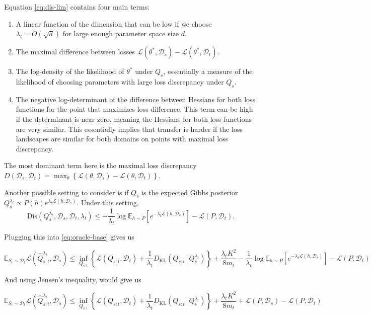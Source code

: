 \documentclass[letterpaper]{article}
\theoremstyle{definition}
\begin{document}
Equation \eqref{eq:dis-lim} contains four main terms:
\begin{enumerate}
	\item A linear function of the dimension that can be low if we choose $\lambda_t=O(\sqrt{d})$ for large enough parameter space size $d$.
	\item The maximal difference between losses $\mathcal{L}(\theta^*, \mathcal{D}_s)-\mathcal{L}(\theta^*, \mathcal{D}_t)$.
	\item The log-density of the likelihood of $\theta^*$ under $Q_s$, essentially a measure of the likelihood of choosing parameters with large loss discrepancy under $Q_s$.
	\item The negative log-determinant of the difference between Hessians for both loss functions for the point that maximizes loss difference. This term can be high if the determinant is near zero, meaning the Hessians for both loss functions are very similar. This essentially implies that transfer is harder if the loss landscapes are similar for both domains on points with maximal loss discrepancy.
\end{enumerate}

The most dominant term here is the maximal loss discrepancy $D(\mathcal{D}_s, \mathcal{D}_t)=\max_{\theta}\left \{\mathcal{L}(\theta, \mathcal{D}_s)-\mathcal{L}(\theta, \mathcal{D}_t) \right \}$.


Another possible setting to consider is if $Q_s$ is the expected Gibbs posterior $Q^{\lambda_t}_{s}\propto P(h)e^{\lambda_t\mathcal{L}(h,\mathcal{D}_s)}$. Under this setting, $$\mathrm{Dis}(Q^{\lambda_t}_{s},\mathcal{D}_s, \mathcal{D}_t, \lambda_t )\leq -\frac{1}{\lambda_t}\log\mathbb{E}_{h\sim P}\left [e^{-\lambda_t\mathcal{L}(h,\mathcal{D}_s)} \right ]-\mathcal{L}(P,\mathcal{D}_t).$$

Plugging this into \eqref{eq:oracle-base} gives us

$$
\mathbb{E}_{S_t\sim \mathcal{D}_t}\mathcal{L}( \hat{Q}^{\lambda_t}_{s:t},\mathcal{D}_s)\leq \inf_{Q_{s:t}}\left \{ \mathcal{L}(Q_{s:t},\mathcal{D}_t) + \frac{1}{\lambda_t}D_{\mathrm{KL}}(Q_{s:t}||Q^{\lambda_t}_{s}) \right \}+\frac{\lambda_t K^2}{8m_t}-\frac{1}{\lambda_t}\log\mathbb{E}_{h\sim P}\left [e^{-\lambda_t\mathcal{L}(h,\mathcal{D}_s)} \right ]-\mathcal{L}(P,\mathcal{D}_t)
$$

And using Jensen's inequality, would give us

\begin{equation}
\mathbb{E}_{S_t\sim \mathcal{D}_t}\mathcal{L}( \hat{Q}^{\lambda_t}_{s:t},\mathcal{D}_s)\leq \inf_{Q_{s:t}}\left \{ \mathcal{L}(Q_{s:t},\mathcal{D}_t) + \frac{1}{\lambda_t}D_{\mathrm{KL}}(Q_{s:t}||Q^{\lambda_t}_{s}) \right \}+\frac{\lambda_t K^2}{8m_t}+\mathcal{L}(P,\mathcal{D}_s)-\mathcal{L}(P,\mathcal{D}_t)
\end{equation}
\end{document}
